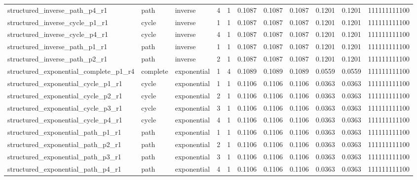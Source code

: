 \begin{tabular}{lllrrrrrrrl}
structured\_inverse\_path\_p4\_r1 & path & inverse & 4 & 1 & 0.1087 & 0.1087 & 0.1087 & 0.1201 & 0.1201 & 111111111100 \\
structured\_inverse\_cycle\_p1\_r1 & cycle & inverse & 1 & 1 & 0.1087 & 0.1087 & 0.1087 & 0.1201 & 0.1201 & 111111111100 \\
structured\_inverse\_cycle\_p4\_r1 & cycle & inverse & 4 & 1 & 0.1087 & 0.1087 & 0.1087 & 0.1201 & 0.1201 & 111111111100 \\
structured\_inverse\_path\_p1\_r1 & path & inverse & 1 & 1 & 0.1087 & 0.1087 & 0.1087 & 0.1201 & 0.1201 & 111111111100 \\
structured\_inverse\_path\_p2\_r1 & path & inverse & 2 & 1 & 0.1087 & 0.1087 & 0.1087 & 0.1201 & 0.1201 & 111111111100 \\
structured\_exponential\_complete\_p1\_r4 & complete & exponential & 1 & 4 & 0.1089 & 0.1089 & 0.1089 & 0.0559 & 0.0559 & 111111111100 \\
structured\_exponential\_cycle\_p1\_r1 & cycle & exponential & 1 & 1 & 0.1106 & 0.1106 & 0.1106 & 0.0363 & 0.0363 & 111111111100 \\
structured\_exponential\_cycle\_p2\_r1 & cycle & exponential & 2 & 1 & 0.1106 & 0.1106 & 0.1106 & 0.0363 & 0.0363 & 111111111100 \\
structured\_exponential\_cycle\_p3\_r1 & cycle & exponential & 3 & 1 & 0.1106 & 0.1106 & 0.1106 & 0.0363 & 0.0363 & 111111111100 \\
structured\_exponential\_cycle\_p4\_r1 & cycle & exponential & 4 & 1 & 0.1106 & 0.1106 & 0.1106 & 0.0363 & 0.0363 & 111111111100 \\
structured\_exponential\_path\_p1\_r1 & path & exponential & 1 & 1 & 0.1106 & 0.1106 & 0.1106 & 0.0363 & 0.0363 & 111111111100 \\
structured\_exponential\_path\_p2\_r1 & path & exponential & 2 & 1 & 0.1106 & 0.1106 & 0.1106 & 0.0363 & 0.0363 & 111111111100 \\
structured\_exponential\_path\_p3\_r1 & path & exponential & 3 & 1 & 0.1106 & 0.1106 & 0.1106 & 0.0363 & 0.0363 & 111111111100 \\
structured\_exponential\_path\_p4\_r1 & path & exponential & 4 & 1 & 0.1106 & 0.1106 & 0.1106 & 0.0363 & 0.0363 & 111111111100 \\
\bottomrule
\end{tabular}
